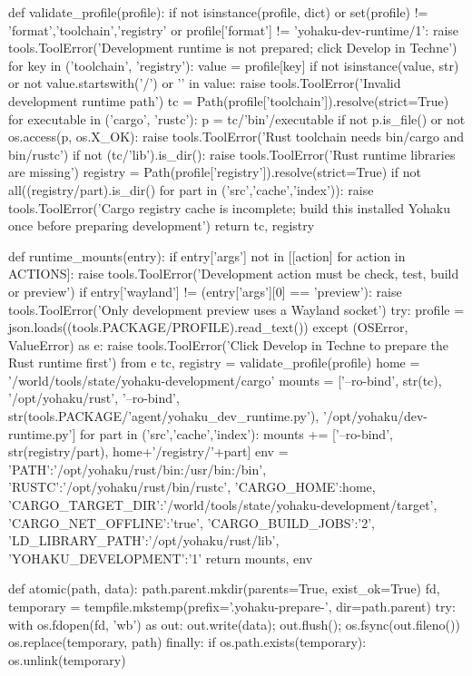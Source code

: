 def validate_profile(profile):
    if not isinstance(profile, dict) or set(profile) != {'format','toolchain','registry'} or profile['format'] != 'yohaku-dev-runtime/1':
        raise tools.ToolError('Development runtime is not prepared; click Develop in Techne')
    for key in ('toolchain', 'registry'):
        value = profile[key]
        if not isinstance(value, str) or not value.startswith('/') or '\0' in value:
            raise tools.ToolError('Invalid development runtime path')
    tc = Path(profile['toolchain']).resolve(strict=True)
    for executable in ('cargo', 'rustc'):
        p = tc/'bin'/executable
        if not p.is_file() or not os.access(p, os.X_OK):
            raise tools.ToolError('Rust toolchain needs bin/cargo and bin/rustc')
    if not (tc/'lib').is_dir(): raise tools.ToolError('Rust runtime libraries are missing')
    registry = Path(profile['registry']).resolve(strict=True)
    if not all((registry/part).is_dir() for part in ('src','cache','index')):
        raise tools.ToolError('Cargo registry cache is incomplete; build this installed Yohaku once before preparing development')
    return tc, registry


def runtime_mounts(entry):
    if entry['args'] not in [[action] for action in ACTIONS]:
        raise tools.ToolError('Development action must be check, test, build or preview')
    if entry['wayland'] != (entry['args'][0] == 'preview'):
        raise tools.ToolError('Only development preview uses a Wayland socket')
    try: profile = json.loads((tools.PACKAGE/PROFILE).read_text())
    except (OSError, ValueError) as e: raise tools.ToolError('Click Develop in Techne to prepare the Rust runtime first') from e
    tc, registry = validate_profile(profile)
    home = '/world/tools/state/yohaku-development/cargo'
    mounts = ['--ro-bind', str(tc), '/opt/yohaku/rust', '--ro-bind',
              str(tools.PACKAGE/'agent/yohaku_dev_runtime.py'), '/opt/yohaku/dev-runtime.py']
    for part in ('src','cache','index'):
        mounts += ['--ro-bind', str(registry/part), home+'/registry/'+part]
    env = {'PATH':'/opt/yohaku/rust/bin:/usr/bin:/bin', 'RUSTC':'/opt/yohaku/rust/bin/rustc',
           'CARGO_HOME':home, 'CARGO_TARGET_DIR':'/world/tools/state/yohaku-development/target',
           'CARGO_NET_OFFLINE':'true', 'CARGO_BUILD_JOBS':'2',
           'LD_LIBRARY_PATH':'/opt/yohaku/rust/lib', 'YOHAKU_DEVELOPMENT':'1'}
    return mounts, env


def atomic(path, data):
    path.parent.mkdir(parents=True, exist_ok=True)
    fd, temporary = tempfile.mkstemp(prefix='.yohaku-prepare-', dir=path.parent)
    try:
        with os.fdopen(fd, 'wb') as out: out.write(data); out.flush(); os.fsync(out.fileno())
        os.replace(temporary, path)
    finally:
        if os.path.exists(temporary): os.unlink(temporary)


